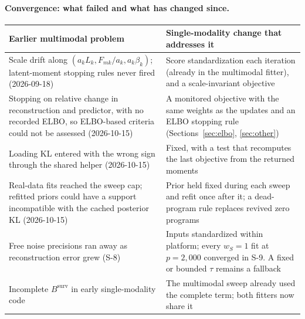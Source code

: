 \documentclass[11pt]{article}
\newcommand{\ws}{w_S}
\begin{document}
\paragraph{Convergence: what failed and what has changed since.}
\begin{center}
\begin{tabularx}{\textwidth}{>{\raggedright\arraybackslash}p{4.4cm}>{\raggedright\arraybackslash}X}
\toprule
Earlier multimodal problem & Single-modality change that addresses it \\
\midrule
Scale drift along $(a_kL_k, F_{mk}/a_k, a_k\beta_k)$; latent-moment stopping rules never fired (2026-09-18) & Score standardization each iteration (already in the multimodal fitter), and a scale-invariant objective \\
Stopping on relative change in reconstruction and predictor, with no recorded ELBO, so ELBO-based criteria could not be assessed (2026-10-15) & A monitored objective with the same weights as the updates and an ELBO stopping rule (Sections~\ref{sec:elbo}, \ref{sec:other}) \\
Loading KL entered with the wrong sign through the shared helper (2026-10-15) & Fixed, with a test that recomputes the last objective from the returned moments \\
Real-data fits reached the sweep cap; refitted priors could have a support incompatible with the cached posterior KL (2026-10-15) & Prior held fixed during each sweep and refit once after it; a dead-program rule replaces revived zero programs \\
Free noise precisions ran away as reconstruction error grew (S-8) & Inputs standardized within platform; every $\ws = 1$ fit at $p = 2{,}000$ converged in S-9. A fixed or bounded $\tau$ remains a fallback \\
Incomplete $B^{\text{surv}}$ in early single-modality code & The multimodal sweep already used the complete term; both fitters now share it \\
\bottomrule
\end{tabularx}
\end{center}
\end{document}
